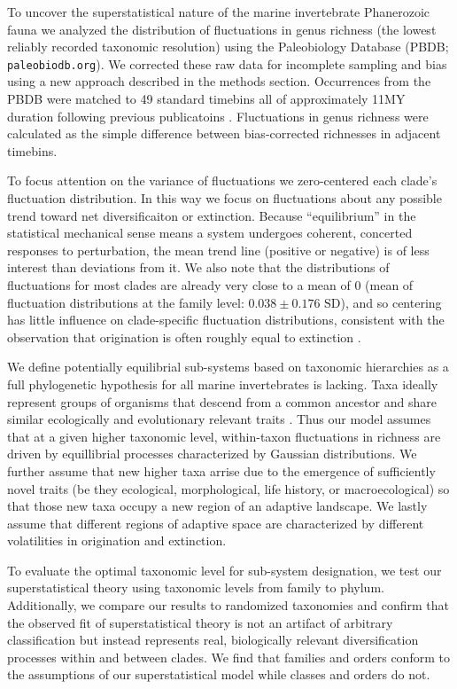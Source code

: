 \documentclass[12pt]{article}
\let\citep=\cite
\begin{document}
To uncover the superstatistical nature of the marine invertebrate
Phanerozoic fauna we analyzed the distribution of fluctuations in
genus richness (the lowest reliably recorded taxonomic resolution)
using the Paleobiology Database (PBDB; {\tt paleobiodb.org}). We
corrected these raw data for incomplete sampling and bias using a new
approach described in the methods section. Occurrences from the PBDB
were matched to 49 standard timebins all of approximately 11MY
duration following previous publicatoins \citep{alroy08,
  alroy2010}. Fluctuations in genus richness were calculated as the
simple difference between bias-corrected richnesses in adjacent
timebins.

To focus attention on the variance of fluctuations we zero-centered
each clade's fluctuation distribution. In this way we focus on
fluctuations about any possible trend toward net diversificaiton or
extinction. Because ``equilibrium'' in the statistical mechanical
sense means a system undergoes coherent, concerted responses to
perturbation, the mean trend line (positive or negative) is of less
interest than deviations from it. We also note that the distributions
of fluctuations for most clades are already very close to a mean of 0
(mean of fluctuation distributions at the family level:
$0.038 \pm 0.176 \text{ SD}$), and so centering has little influence
on clade-specific fluctuation distributions, consistent with the
observation that origination is often roughly equal to extinction
\citep{foote2010Chapter}.

We define potentially equilibrial sub-systems based on taxonomic
hierarchies as a full phylogenetic hypothesis for all marine
invertebrates is lacking.  Taxa ideally represent groups of organisms
that descend from a common ancestor and share similar ecologically and
evolutionary relevant traits \citep{mayr1965systZool, erwin2007,
  ezard2016}. Thus our model assumes that at a given higher taxonomic
level, within-taxon fluctuations in richness are driven by
equillibrial processes characterized by Gaussian distributions. We
further assume that new higher taxa arrise due to the emergence of
sufficiently novel traits (be they ecological, morphological, life
history, or macroecological) so that those new taxa occupy a new
region of an adaptive landscape. We lastly assume that different
regions of adaptive space are characterized by different volatilities
in origination and extinction.

To evaluate the optimal taxonomic level for sub-system designation, we
test our superstatistical theory using taxonomic levels from family to
phylum. Additionally, we compare our results to randomized taxonomies
and confirm that the observed fit of superstatistical theory is not an
artifact of arbitrary classification but instead represents real,
biologically relevant diversification processes within and between
clades. We find that families and orders conform to the assumptions of
our superstatistical model while classes and orders do not.
\end{document}
